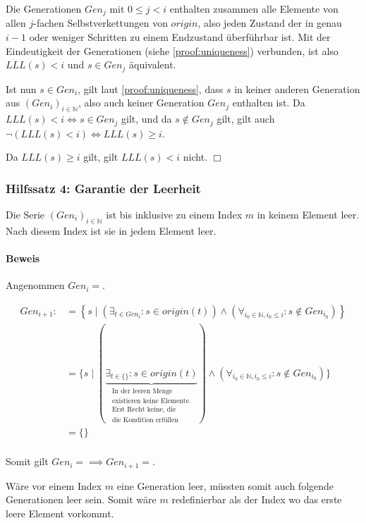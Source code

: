 \documentclass[a4paper,10pt,ngerman]{scrartcl}
\begin{document}
Die Generationen \(Gen_j\) mit \(0 \leq j < i\) enthalten zusammen alle Elemente von allen \(j\)-fachen Selbstverkettungen von \(origin\), also jeden Zustand der in genau \(i-1\) oder weniger Schritten zu einem Endzustand überführbar ist. Mit der Eindeutigkeit der Generationen (siehe \cref{proof:uniqueness}) verbunden, ist also \(LLL(s) < i\) und \(s \in Gen_j\) äquivalent.

Ist nun \(s \in Gen_i\), gilt laut \cref{proof:uniqueness}, dass \(s\) in keiner anderen Generation aus \((Gen_i)_{i\in\mathbb{N}}\), also auch keiner Generation \(Gen_j\) enthalten ist. Da \(LLL(s) < i \iff s \in Gen_j\) gilt, und da \(s \notin Gen_j\) gilt, gilt auch \(\lnot(LLL(s) < i) \iff LLL(s) \geq i\).

Da \(LLL(s) \geq i\) gilt, gilt \(LLL(s) < i\) nicht. \(\Box\)

\subsubsection{Hilfssatz 4: Garantie der Leerheit} \label{proof:termination}

Die Serie \((Gen_i)_{i\in\mathbb{N}}\) ist bis inklusive zu einem Index \(m\) in keinem Element leer. Nach diesem Index ist sie in jedem Element leer.

\paragraph{Beweis}

Angenommen \(Gen_i = {}\).

\begin{align*}
    Gen_{i+1} :&= \left\{ s \mid \left(\exists_{t \in Gen_i} : s \in origin(t)\right) \land \left(\forall_{i_0\in\mathbb{N}, i_0 \leq i}: s \notin Gen_{i_0}\right) \right\} \\
    & = \{ s \mid (\underbrace{\exists_{t \in \{\}} : s \in origin(t)}_{\substack{\text{In der leeren Menge}\\\text{existieren keine Elemente.}\\\text{Erst Recht keine, die}\\\text{die Kondition erfüllen}}}) \land (\forall_{i_0\in\mathbb{N}, i_0 \leq i}: s \notin Gen_{i_0}) \} \\
    & = \{\} \\
\end{align*}

Somit gilt \(Gen_i = {} \implies Gen_{i+1} = {}\).

Wäre vor einem Index \(m\) eine Generation leer, müssten somit auch folgende Generationen leer sein. Somit wäre \(m\) redefinierbar als der Index wo das erste leere Element vorkommt.
\end{document}
